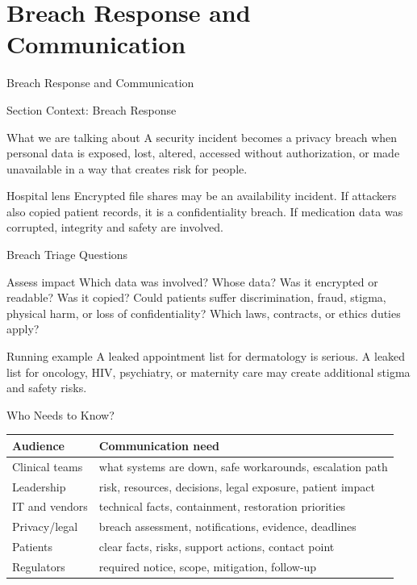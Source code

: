 \documentclass[presentation]{beamer}
\newcommand{\sectiontitleframe}[1]{
\begin{frame}[plain,c]
\begin{center}
{\usebeamerfont{title}\usebeamercolor[fg]{title}#1}
\end{center}
\end{frame}
}
\begin{document}
\section{Breach Response and Communication}
\sectiontitleframe{Breach Response and Communication}

\begin{frame}[c]{Section Context: Breach Response}
\begin{block}{What we are talking about}
A security incident becomes a privacy breach when personal data is exposed, lost, altered, accessed
without authorization, or made unavailable in a way that creates risk for people.
\end{block}

\begin{exampleblock}{Hospital lens}
Encrypted file shares may be an availability incident. If attackers also copied patient records, it
is a confidentiality breach. If medication data was corrupted, integrity and safety are involved.
\end{exampleblock}
\end{frame}

\begin{frame}[c]{Breach Triage Questions}
\begin{block}{Assess impact}
Which data was involved? Whose data? Was it encrypted or readable? Was it copied? Could patients
suffer discrimination, fraud, stigma, physical harm, or loss of confidentiality? Which laws,
contracts, or ethics duties apply?
\end{block}

\begin{exampleblock}{Running example}
A leaked appointment list for dermatology is serious. A leaked list for oncology, HIV, psychiatry,
or maternity care may create additional stigma and safety risks.
\end{exampleblock}
\end{frame}

\begin{frame}[c]{Who Needs to Know?}
\small
\begin{tabularx}{\textwidth}{@{}p{}X@{}}
\toprule
\textbf{Audience} & \textbf{Communication need} \\
\midrule
Clinical teams & what systems are down, safe workarounds, escalation path \\
Leadership & risk, resources, decisions, legal exposure, patient impact \\
IT and vendors & technical facts, containment, restoration priorities \\
Privacy/legal & breach assessment, notifications, evidence, deadlines \\
Patients & clear facts, risks, support actions, contact point \\
Regulators & required notice, scope, mitigation, follow-up \\
\bottomrule
\end{tabularx}
\end{frame}
\end{document}
